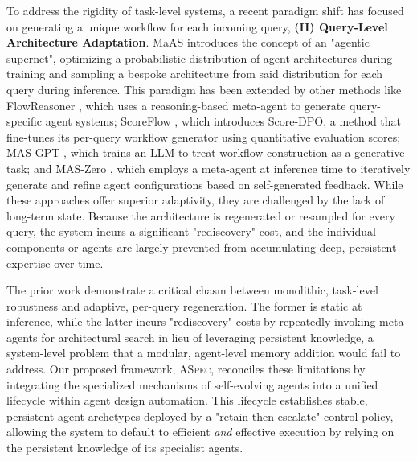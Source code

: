 \documentclass{article} %
\begin{document}
To address the rigidity of task-level systems, a recent paradigm shift has focused on generating a unique workflow for each incoming query, \textbf{(II) Query-Level Architecture Adaptation}. MaAS \citep{zhang2025multi} introduces the concept of an "agentic supernet", optimizing a probabilistic distribution of agent architectures during training and sampling a bespoke architecture from said distribution for each query during inference. This paradigm has been extended by other methods like FlowReasoner \citep{gao2025flowreasoner}, which uses a reasoning-based meta-agent to generate query-specific agent systems; ScoreFlow \citep{wang2025scoreflow}, which introduces Score-DPO, a method that fine-tunes its per-query workflow generator using quantitative evaluation scores; MAS-GPT \citep{ye2025masgpt}, which trains an LLM to treat workflow construction as a generative task; and MAS-Zero \citep{ke2025maszero}, which employs a meta-agent at inference time to iteratively generate and refine agent configurations based on self-generated feedback. While these approaches offer superior adaptivity, they are challenged by the lack of long-term state. Because the architecture is regenerated or resampled for every query, the system incurs a significant "rediscovery" cost, and the individual components or agents are largely prevented from accumulating deep, persistent expertise over time. 

The prior work demonstrate a critical chasm between monolithic, task-level robustness and adaptive, per-query regeneration. The former is static at inference, while the latter incurs "rediscovery" costs by repeatedly invoking meta-agents for architectural search in lieu of leveraging persistent knowledge, a system-level problem that a modular, agent-level memory addition would fail to address. Our proposed framework, \textsc{ASpec}, reconciles these limitations by integrating the specialized mechanisms of self-evolving agents into a unified lifecycle within agent design automation. This lifecycle establishes stable, persistent agent archetypes deployed by a "retain-then-escalate" control policy, allowing the system to default to efficient \textit{and} effective execution by relying on the persistent knowledge of its specialist agents.
\end{document}
